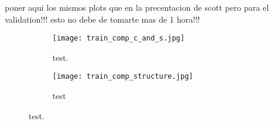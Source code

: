 
\glsresetall
\graphicspath{{./Sections/Results/Resources/}}

poner aqui los mismos plots que en la precentacion de scott pero para el validation!!! esto no debe de tomarte mas de 1 hora!!!

\begin{figure}[!ht]
  \centering
  \begin{subfigure}[b]{.9\linewidth}
    \texttt{[image: train\_comp\_c\_and\_s.jpg]}
    \caption{test.}
    \label{fig:results:simple_performance:test}
  \end{subfigure}%
  \vspace{3mm}
  \begin{subfigure}[b]{.9\linewidth}
    \texttt{[image: train\_comp\_structure.jpg]}
    \caption{test}
    \label{fig:results:simple_performance:test2}
  \end{subfigure}
  \caption{test.}
  \label{fig:results:simple_performance}
\end{figure}
